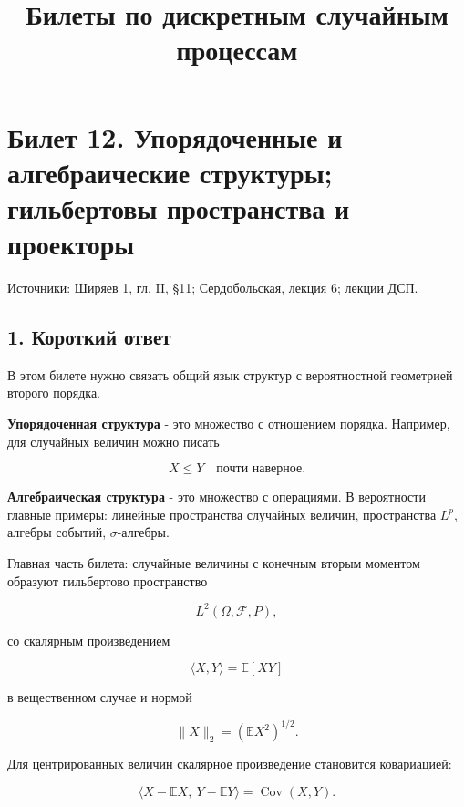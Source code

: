 \documentclass[
  11pt,
  a4paper,
]{article}
\title{Билеты по дискретным случайным процессам}
\author{}
\date{}
\begin{document}
\maketitle

\section{Билет 12. Упорядоченные и алгебраические структуры; гильбертовы
пространства и
проекторы}\label{ux431ux438ux43bux435ux442-12.-ux443ux43fux43eux440ux44fux434ux43eux447ux435ux43dux43dux44bux435-ux438-ux430ux43bux433ux435ux431ux440ux430ux438ux447ux435ux441ux43aux438ux435-ux441ux442ux440ux443ux43aux442ux443ux440ux44b-ux433ux438ux43bux44cux431ux435ux440ux442ux43eux432ux44b-ux43fux440ux43eux441ux442ux440ux430ux43dux441ux442ux432ux430-ux438-ux43fux440ux43eux435ux43aux442ux43eux440ux44b}

Источники: Ширяев 1, гл. II, §11; Сердобольская, лекция 6; лекции ДСП.

\subsection{1. Короткий
ответ}\label{ux43aux43eux440ux43eux442ux43aux438ux439-ux43eux442ux432ux435ux442}

В этом билете нужно связать общий язык структур с вероятностной
геометрией второго порядка.

\textbf{Упорядоченная структура} - это множество с отношением порядка.
Например, для случайных величин можно писать

\[
X\le Y \quad \text{почти наверное}.
\]

\textbf{Алгебраическая структура} - это множество с операциями. В
вероятности главные примеры: линейные пространства случайных величин,
пространства \(L^p\), алгебры событий, \(\sigma\)-алгебры.

Главная часть билета: случайные величины с конечным вторым моментом
образуют гильбертово пространство

\[
L^2(\Omega,\mathcal F,P),
\]

со скалярным произведением

\[
\langle X,Y\rangle=\mathbb E[XY]
\]

в вещественном случае и нормой

\[
\|X\|_2=(\mathbb EX^2)^{1/2}.
\]

Для центрированных величин скалярное произведение становится
ковариацией:

\[
\langle X-\mathbb EX,\ Y-\mathbb EY\rangle
=
\operatorname{Cov}(X,Y).
\]
\end{document}
